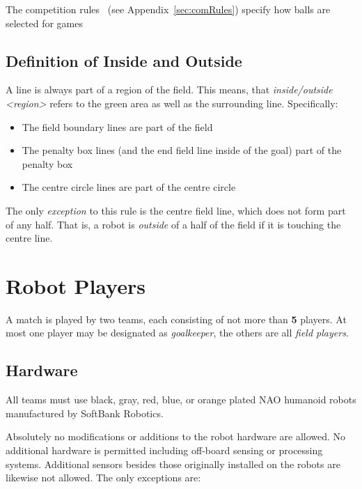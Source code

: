 \documentclass[12pt]{article}
\newcommand{\cf}{see\xspace}
\begin{document}
The competition rules ~(\cf Appendix~\ref{sec:comRules}) specify how balls are selected for games

\subsection{Definition of Inside and Outside}
\label{sec:inside_outside}

A line is always part of a region of the field.
This means, that \emph{inside/outside \textless region\textgreater} refers to the green area as well as the surrounding line.
Specifically:
\begin{itemize}
    \item The field boundary lines are part of the field
    \item The penalty box lines (and the end field line inside of the goal) part of the penalty box
    \item The centre circle lines are part of the centre circle
\end{itemize}

The only \textit{exception} to this rule is the centre field line, which does not form part of any half.
That is, a robot is \textit{outside} of a half of the field if it is touching the centre line.

\newpage
\section{Robot Players}
\label{sec:robot_players}
A match is played by two teams, each consisting of not more than \textbf{5} players. At most one player may be designated as \emph{goalkeeper}, the others are all \emph{field players}.

\subsection{Hardware}
\label{sec:hardware}
All teams must use black, gray, red, blue, or orange plated NAO humanoid robots manufactured by SoftBank Robotics.

Absolutely no modifications or additions to the robot hardware are allowed. No additional hardware is permitted including off-board sensing or processing systems. Additional sensors besides those originally installed on the robots are likewise not allowed. The only exceptions are:
\end{document}
